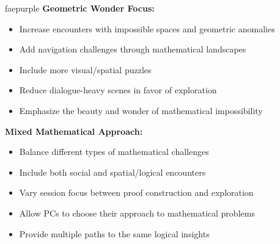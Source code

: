 \documentclass[11pt]{article}
\begin{document}
\begin{campaignsection}{faepurple}
\textbf{Geometric Wonder Focus:}
\begin{itemize}
    \item Increase encounters with impossible spaces and geometric anomalies
    \item Add navigation challenges through mathematical landscapes
    \item Include more visual/spatial puzzles
    \item Reduce dialogue-heavy scenes in favor of exploration
    \item Emphasize the beauty and wonder of mathematical impossibility
\end{itemize}

\textbf{Mixed Mathematical Approach:}
\begin{itemize}
    \item Balance different types of mathematical challenges
    \item Include both social and spatial/logical encounters
    \item Vary session focus between proof construction and exploration
    \item Allow PCs to choose their approach to mathematical problems
    \item Provide multiple paths to the same logical insights
\end{itemize}
\end{campaignsection}

\newpage
\end{document}
